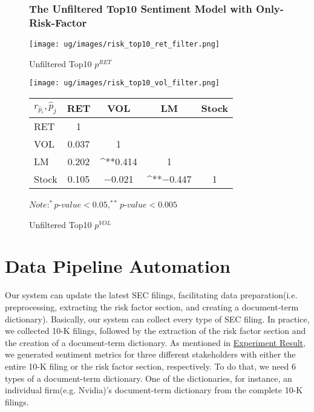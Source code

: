 \documentclass[logo,bsc,singlespacing,parskip]{infthesis}
\begin{document}
\begin{figure}[ht]
\subsection{The Unfiltered Top10 Sentiment Model with Only-Risk-Factor}
\label{appendix_risk_top10}
\begin{minipage}{0.90\textwidth}
  \centering
  \begin{minipage}{0.5\textwidth}
    \centering
    \texttt{[image: ug/images/risk\_top10\_ret\_filter.png]}
    \caption{\small Unfiltered Top10 ${p}^{RET}$}
    \label{fig:risk_top10_ret_unfiltered}
  \end{minipage}%
  \begin{minipage}{0.5\textwidth}
    \centering
    \texttt{[image: ug/images/risk\_top10\_vol\_filter.png]} 
    \caption{\small Unfiltered Top10 ${p}^{VOL}$}
    \label{fig:risk_top10_vol_unfiltered}
  \end{minipage}


    \begin{minipage}[t]{0.9\textwidth}
    \centering
    \begin{tabular}{lcccc}
    \label{tab:risk_top10_corr_unfiltered}
    $r_\hat{p}_i,\hat{p}_j$      & RET       & VOL       & LM        & Stock    \\ \hline
    RET    & 1  &  &  &  \\
    VOL    & 0.037   & 1  &  &  \\
    LM    & 0.202 & ^{**}0.414 & 1  &  \\
    Stock  &  0.105 & $-$0.021  & ^{**}$-$0.447 & 1  \\ \hline
    \end{tabular}
    \medskip
    $\textit{Note}: ^{*}p$-$value<0.05, ^{**}p$-$value<0.005$
    \end{minipage}

\end{minipage}
\end{figure}

\chapter{Data Pipeline Automation}
\label{appendix_airflow}

Our system can update the latest SEC filings, facilitating data preparation(i.e. preprocessing, extracting the risk factor section, and creating a document-term dictionary). Basically, our system can collect every type of SEC filing. In practice, we collected 10-K filings, followed by the extraction of the risk factor section and the creation of a document-term dictionary. As mentioned in \hyperref[descriptive_statistics]{Experiment Result}, we generated sentiment metrics for three different stakeholders with either the entire 10-K filing or the risk factor section, respectively. To do that, we need 6 types of a document-term dictionary. One of the dictionaries, for instance, an individual firm(e.g. Nvidia)'s document-term dictionary from the complete 10-K filings.
\end{document}
